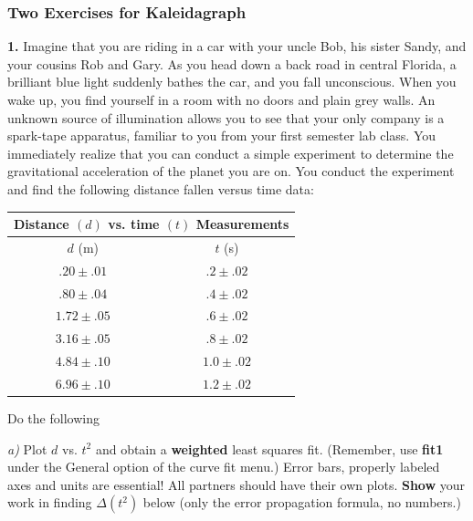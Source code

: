 \subsubsection{Two Exercises for Kaleidagraph}
\noindent
{\bf 1.} Imagine that you are riding in a car with your uncle Bob, his sister 
Sandy, and your cousins Rob and Gary. As you head down a back road in 
central Florida, a brilliant blue light suddenly bathes the car, and you
fall unconscious. When you wake up, you find yourself in a room with no 
doors and plain grey walls. An unknown source of illumination allows you
to see that your only company is a spark-tape apparatus, familiar to you
from your first semester lab class. You immediately realize that you can
conduct a simple experiment to determine the gravitational acceleration of 
the planet you are on. You conduct the experiment and find the following
distance fallen versus time data:

\vspace*{0.5cm}
\begin{center}
\begin{tabular}{|c|c|}
\hline
\multicolumn{2}{|c|}{Distance $(d)$ vs. time $(t)$ Measurements} \\
\hline\hline
$d$ (m) & $t$ (s) \\
\hline
  $.20 \pm .01$      &   $.2 \pm .02$   \\
\hline    
  $.80 \pm .04$      &   $.4 \pm .02$   \\
\hline
  $1.72 \pm .05$     &   $.6 \pm .02$   \\
\hline
  $3.16\pm .05$     &  $.8 \pm .02$    \\
\hline
  $4.84 \pm .10$     &  $ 1.0 \pm .02$    \\
\hline
  $6.96 \pm .10$      & $ 1.2 \pm .02$     \\
\hline
\end{tabular}
\end{center}

\vspace*{0.5cm}
\noindent
Do the following

{\it a)} Plot $d$ vs. $t^2$ and obtain a {\bf weighted} least squares fit.
(Remember, use {\bf fit1} under the General option of the curve fit menu.)
Error bars, properly labeled axes and units are essential!  All partners 
should have their own plots.  {\bf Show}
your work in finding $\Delta(t^2)$ below (only the error propagation formula, no numbers.) \\
\vspace*{2cm} \\

